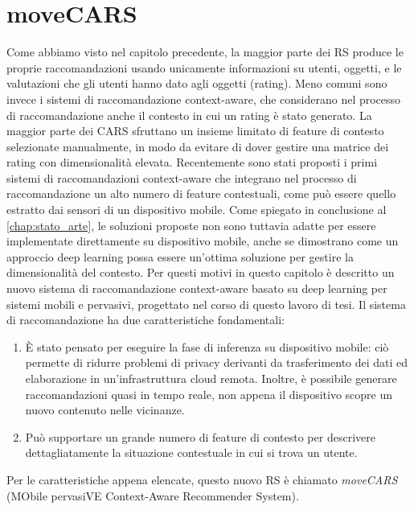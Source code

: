 \documentclass[12pt,italian]{report}
\begin{document}
\chapter{moveCARS}
\label{chap:classificatore}
Come abbiamo visto nel capitolo precedente, la maggior parte dei RS produce le proprie raccomandazioni usando unicamente informazioni su utenti, oggetti, e le valutazioni che gli utenti hanno dato agli oggetti (rating). Meno comuni sono invece i sistemi di raccomandazione context-aware, che considerano nel processo di raccomandazione anche il contesto in cui un rating è stato generato. La maggior parte dei CARS sfruttano un insieme limitato di feature di contesto selezionate manualmente, in modo da evitare di dover gestire una matrice dei rating con dimensionalità elevata. Recentemente sono stati proposti i primi sistemi di raccomandazioni context-aware che integrano nel processo di raccomandazione un alto numero di feature contestuali, come può essere quello estratto dai sensori di un dispositivo mobile. Come spiegato in conclusione al \autoref{chap:stato_arte}, le soluzioni proposte non sono tuttavia adatte per essere implementate direttamente su dispositivo mobile, anche se dimostrano come un approccio deep learning possa essere un'ottima soluzione per gestire la dimensionalità del contesto. Per questi motivi in questo capitolo è descritto un nuovo sistema di raccomandazione context-aware basato su deep learning per sistemi mobili e pervasivi, progettato nel corso di questo lavoro di tesi. Il sistema di raccomandazione ha due caratteristiche fondamentali: 
\begin{enumerate}
\item \`E stato pensato per eseguire la fase di inferenza su dispositivo mobile: ciò permette di ridurre problemi di privacy derivanti da trasferimento dei dati ed elaborazione in un'infrastruttura cloud remota. Inoltre, è possibile generare raccomandazioni quasi in tempo reale, non appena il dispositivo scopre un nuovo contenuto nelle vicinanze.
\item Può supportare un grande numero di feature di contesto per descrivere dettagliatamente la situazione contestuale in cui si trova un utente. 
\end{enumerate}

Per le caratteristiche appena elencate, questo nuovo RS è chiamato \textit{moveCARS} (MObile pervasiVE Context-Aware Recommender System).
\end{document}
